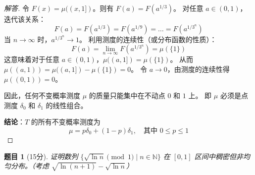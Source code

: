 \documentclass[a4paper,12pt]{article}
\newtheorem{problem}{题目}
\newenvironment{solution}{\begin{proof}[解答]}{\end{proof}}
\begin{document}
\begin{solution}
    令 $F(x) = \mu((x, 1])$。则有 $F(a) = F(a^{1/3})$。
    对任意 $a \in (0, 1)$，迭代该关系：
    $$ F(a) = F(a^{1/3}) = F(a^{1/9}) = \dots = F(a^{1/3^n}) $$
    当 $n \to \infty$ 时，$a^{1/3^n} \to 1$。
    利用测度的连续性（或分布函数的性质）：
    $$ F(a) = \lim_{n \to \infty} F(a^{1/3^n}) = \mu(\{1\}) $$
    这意味着对于任意 $a \in (0, 1)$，$\mu((a, 1]) = \mu(\{1\})$。
    从而 $\mu((a, 1)) = \mu((a, 1]) - \mu(\{1\}) = 0$。
    令 $a \to 0$，由测度的连续性得 $\mu((0, 1)) = 0$。
    
    因此，任何不变概率测度 $\mu$ 的质量只能集中在不动点 $0$ 和 $1$ 上。
    即 $\mu$ 必须是点测度 $\delta_0$ 和 $\delta_1$ 的线性组合。
    
    \textbf{结论}：$T$ 的所有不变概率测度为
    $$ \mu = p \delta_0 + (1-p) \delta_1, \quad \text{其中 } 0 \le p \le 1 $$
\end{solution}

\begin{problem}[15分]
    证明数列 $\{\sqrt{\ln n} \pmod 1 \mid n \in \mathbb{N}\}$ 在 $[0, 1]$ 区间中稠密但非均匀分布。（考虑 $\sqrt{\ln(n+1)} - \sqrt{\ln n}$）
\end{problem}
\end{document}
